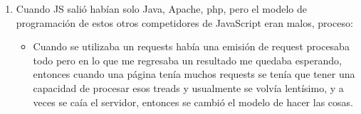 \begin{enumerate}
    \item Cuando JS salió habían solo Java, Apache, php, pero el modelo de programación de estos otros competidores de JavaScript eran malos, proceso: 
        \begin{itemize}
            \item Cuando se utilizaba un requests había una emisión de request procesaba todo pero en lo que me regresaba un resultado me quedaba esperando, entonces cuando una página tenía muchos requests se tenía que tener una capacidad de procesar esos treads y usualmente se volvía lentísimo, y a veces se caía el servidor, entonces se cambió el modelo de hacer las cosas.
        \end{itemize}
\end{enumerate}
